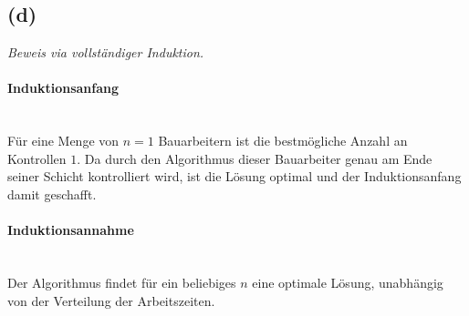 \documentclass[a4paper,12pt]{article}
\begin{document}
\subsection*{(d)}
\textit{Beweis via vollständiger Induktion.}

\paragraph*{Induktionsanfang} \mbox{}\\
Für eine Menge von $n=1$ Bauarbeitern ist die bestmögliche Anzahl an Kontrollen $1$. Da durch den Algorithmus dieser Bauarbeiter genau am Ende seiner Schicht kontrolliert wird, ist die Lösung optimal und der Induktionsanfang damit geschafft.

\paragraph*{Induktionsannahme} \mbox{}\\
Der Algorithmus findet für ein beliebiges $n$ eine optimale Lösung, unabhängig von der Verteilung der Arbeitszeiten.
\end{document}

